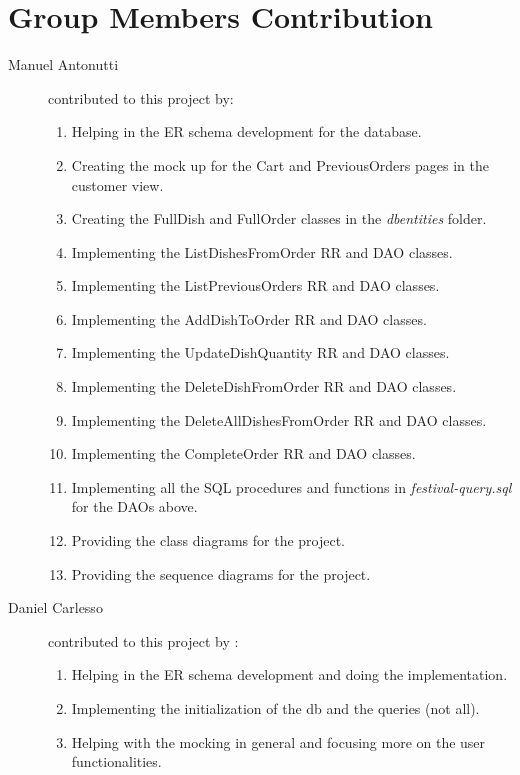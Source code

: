 \section{Group Members Contribution}


\begin{description}
	\item[Manuel Antonutti] contributed to this project by:
		\begin{enumerate}
			\item Helping in the ER schema development for the database.
			\item Creating the mock up for the Cart and PreviousOrders pages in the customer view.
			\item Creating the FullDish and FullOrder classes in the \textit{dbentities} folder.
			\item Implementing the ListDishesFromOrder RR and DAO classes.
			\item Implementing the ListPreviousOrders RR and DAO classes.
			\item Implementing the AddDishToOrder RR and DAO classes.
			\item Implementing the UpdateDishQuantity RR and DAO classes.
			\item Implementing the DeleteDishFromOrder RR and DAO classes.
			\item Implementing the DeleteAllDishesFromOrder RR and DAO classes.
			\item Implementing the CompleteOrder RR and DAO classes.
			\item Implementing all the SQL procedures and functions in \textit{festival-query.sql} for the DAOs above.
			\item Providing the class diagrams for the project.
			\item Providing the sequence diagrams for the project.
		\end{enumerate}
	\item[Daniel Carlesso] contributed to this project by :
            \begin{enumerate}
                \item Helping in the ER schema development and doing the implementation.
                \item Implementing the initialization of the db and the queries (not all).
                \item Helping with the mocking in general and focusing more on the user functionalities.

\end{enumerate}
\end{description}
